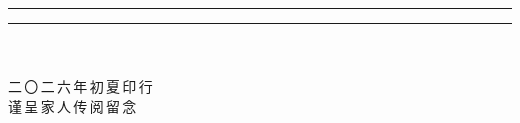 \documentclass[a5paper,11pt,openright,oneside]{ctexbook}
\begin{document}
\vfill

\begin{center}
  {\color{seal}\rule{1.4em}{0.5pt}}\hspace{0.4em}%
    \raisebox{-1pt}{\color{seal}$\blacklozenge$}\hspace{0.4em}%
  {\color{seal}\rule{1.4em}{0.5pt}}\\[1.0cm]

  \redseal\\[1.2cm]

  {\bookserifthin\footnotesize\color{inkgray}
    二\,〇\,二\,六\,年\,初\,夏\,印\,行\\[10pt]
    谨\,呈\,家\,人\,传\,阅\,留\,念
  }
\end{center}

\vspace*{1.4cm}
\end{document}
